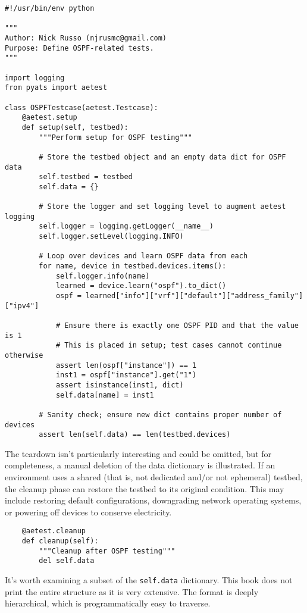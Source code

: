 \begin{verbatim}
#!/usr/bin/env python

"""
Author: Nick Russo (njrusmc@gmail.com)
Purpose: Define OSPF-related tests.
"""

import logging
from pyats import aetest

class OSPFTestcase(aetest.Testcase):
    @aetest.setup
    def setup(self, testbed):
        """Perform setup for OSPF testing"""

        # Store the testbed object and an empty data dict for OSPF data
        self.testbed = testbed
        self.data = {}

        # Store the logger and set logging level to augment aetest logging
        self.logger = logging.getLogger(__name__)
        self.logger.setLevel(logging.INFO)

        # Loop over devices and learn OSPF data from each
        for name, device in testbed.devices.items():
            self.logger.info(name)
            learned = device.learn("ospf").to_dict()
            ospf = learned["info"]["vrf"]["default"]["address_family"]["ipv4"]

            # Ensure there is exactly one OSPF PID and that the value is 1
            # This is placed in setup; test cases cannot continue otherwise
            assert len(ospf["instance"]) == 1
            inst1 = ospf["instance"].get("1")
            assert isinstance(inst1, dict)
            self.data[name] = inst1

        # Sanity check; ensure new dict contains proper number of devices
        assert len(self.data) == len(testbed.devices)
\end{verbatim}

The teardown isn't particularly interesting and could be omitted, but for
completeness, a manual deletion of the data dictionary is illustrated. If
an environment uses a shared (that is, not dedicated and/or not ephemeral)
testbed, the cleanup phase can restore the testbed to its original condition.
This may include restoring default configurations, downgrading network
operating systems, or powering off devices to conserve electricity.

\begin{verbatim}
    @aetest.cleanup
    def cleanup(self):
        """Cleanup after OSPF testing"""
        del self.data
\end{verbatim}

It's worth examining a subset of the \verb|self.data| dictionary. This book
does not print the entire structure as it is very extensive. The format is
deeply hierarchical, which is programmatically easy to traverse.

